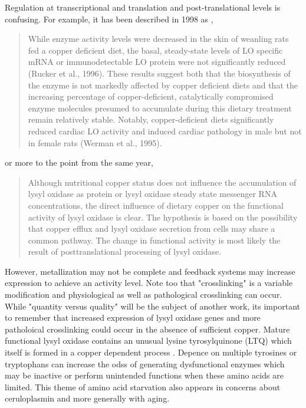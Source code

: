 {Regulation at transcriptional and translation and post-translational
levels is confusing. For example, it has been described in
1998 as \cite{SmithMungo_Kagan_Lysyl_oxidase_Properties_regulation_1998},
\begin{quote}
While enzyme activity levels were decreased in the skin of weanling rats
fed a copper deficient diet, the basal, steady-state levels of LO specific
mRNA or immunodetectable LO protein were not significantly reduced (Rucker
et al., 1996). These results suggest both that the biosynthesis of the enzyme
is not markedly affected by copper deficient diets and that the increasing
percentage of copper-deficient, catalytically compromised enzyme molecules
presumed to accumulate during this dietary treatment remain relatively stable.
Notably, copper-deficient diets significantly reduced cardiac LO activity
and induced cardiac pathology in male but not in female rats (Werman et
al., 1995). 
\end{quote}
or more to the point from the same year,
\cite{Rucker_Kosonen_Clegg_Copper_lysyl_oxidase_1998}
\begin{quote}
Although nutritional copper status does not influence the accumulation of
lysyl oxidase as protein or lysyl oxidase steady state messenger RNA concentrations,
the direct influence of dietary copper on the functional activity of lysyl
oxidase is clear. The hypothesis is based on the possibility that copper
efflux and lysyl oxidase secretion from cells may share a common pathway.
The change in functional activity is most likely the result of posttranslational
processing of lysyl oxidase.
\end{quote}

However, metallization may not be complete
and feedback systems may increase expression to achieve
an activity level. Note too that "crosslinking" is
a variable modification and physiological as well as
pathological crosslinking can occur. 
While "quantity versus quality" will be the subject of
another work, its important to remember that increased
expression of lysyl oxidase genes and more patholoical
crosslinking could occur in the absence of sufficient copper.
Mature functional lysyl oxidase contains an unusual 
 lysine tyrosylquinone (LTQ) which itself is formed in 
a copper dependent process \cite{PMC2749888}.
Depence on multiple tyrosines or tryptophans   can
increase the odss of generating dysfunctional
enzymes which may be inactive or perform unintended functions 
when these amino acids are limited. This theme of amino
acid starvation also appears in concerns about ceruloplasmin
and more generally with aging. 

} %
